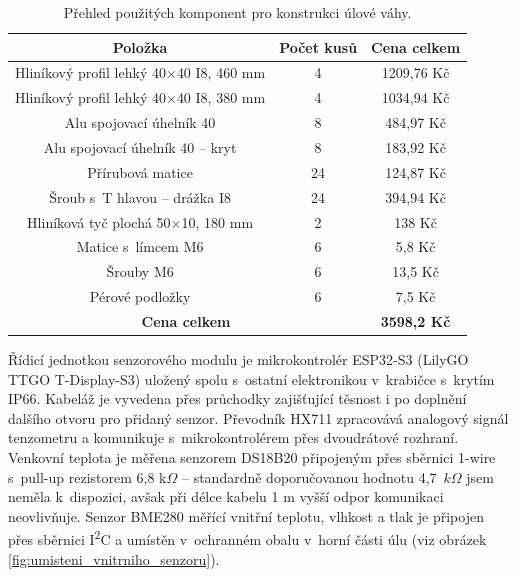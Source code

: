 \begin{table}[H]
    \centering
    \begin{tabular}{|c|c|c|}
    \hline
        \textbf{Položka} & \textbf{Počet kusů} & \textbf{Cena celkem} \\
        \hline
        Hliníkový profil lehký 40$\times$40 I8, 460 mm & 4 & 1209,76 Kč\\
        \hline
        Hliníkový profil lehký 40$\times$40 I8, 380 mm & 4 & 1034,94 Kč\\
        \hline
        Alu spojovací úhelník 40 & 8 & 484,97 Kč\\
        \hline
        Alu spojovací úhelník 40 -- kryt & 8 & 183,92 Kč\\
        \hline
        Přírubová matice & 24 & 124,87 Kč\\
        \hline
        Šroub s~T hlavou -- drážka I8 & 24 & 394,94 Kč\\
        \hline
        Hliníková tyč plochá 50$\times$10, 180 mm & 2 & 138 Kč\\
        \hline
        Matice s~límcem M6 & 6 & 5,8 Kč\\
        \hline
        Šrouby M6 & 6 & 13,5 Kč\\
        \hline
        Pérové podložky & 6 & 7,5 Kč\\
        \hline
        \multicolumn{2}{|c|}{\textbf{Cena celkem}} & \textbf{3598,2 Kč} \\
        \hline
    \end{tabular}
    \caption{Přehled použitých komponent pro konstrukci úlové váhy.}
    \label{tab:konstrukce_vaha}
\end{table}

Řídicí jednotkou senzorového modulu je mikrokontrolér ESP32-S3 (LilyGO TTGO T-Display-S3) uložený spolu s~ostatní elektronikou v~krabičce s~krytím IP66. Kabeláž je vyvedena přes průchodky zajišťující těsnost i po doplnění dalšího otvoru pro přidaný senzor. Převodník HX711 zpracovává analogový signál tenzometru a komunikuje s~mikrokontrolérem přes dvoudrátové rozhraní. Venkovní teplota je měřena senzorem DS18B20 připojeným přes sběrnici 1-wire s~pull-up rezistorem 6,8 k$\Omega$ -- standardně doporučovanou hodnotu 4,7~$k\Omega$ jsem neměla k~dispozici, avšak při délce kabelu 1 m vyšší odpor komunikaci neovlivňuje. Senzor BME280 měřící vnitřní teplotu, vlhkost a tlak je připojen přes sběrnici I\textsuperscript{2}C a umístěn v~ochranném obalu v~horní části úlu (viz obrázek \ref{fig:umisteni_vnitrniho_senzoru}).

